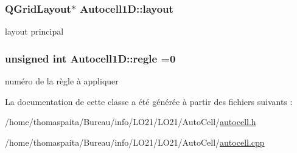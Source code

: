 \subsubsection[{\texorpdfstring{layout}{layout}}]{\setlength{\rightskip}{0pt plus 5cm}Q\+Grid\+Layout$\ast$ Autocell1\+D\+::layout\hspace{0.3cm}{\ttfamily [protected]}}\hypertarget{class_autocell1_d_a7934db954892dc0efc12a961686a75c0}{}\label{class_autocell1_d_a7934db954892dc0efc12a961686a75c0}
layout principal 
\subsubsection[{\texorpdfstring{regle}{regle}}]{\setlength{\rightskip}{0pt plus 5cm}unsigned int Autocell1\+D\+::regle =0\hspace{0.3cm}{\ttfamily [protected]}}\hypertarget{class_autocell1_d_ae28c4a70102bd5e08a2414d27b20bb47}{}\label{class_autocell1_d_ae28c4a70102bd5e08a2414d27b20bb47}
numéro de la règle à appliquer 

La documentation de cette classe a été générée à partir des fichiers suivants \+:\begin{DoxyCompactItemize}
\item 
/home/thomaspaita/\+Bureau/info/\+L\+O21/\+L\+O21/\+Auto\+Cell/\hyperlink{autocell_8h}{autocell.\+h}\item 
/home/thomaspaita/\+Bureau/info/\+L\+O21/\+L\+O21/\+Auto\+Cell/\hyperlink{autocell_8cpp}{autocell.\+cpp}\end{DoxyCompactItemize}
